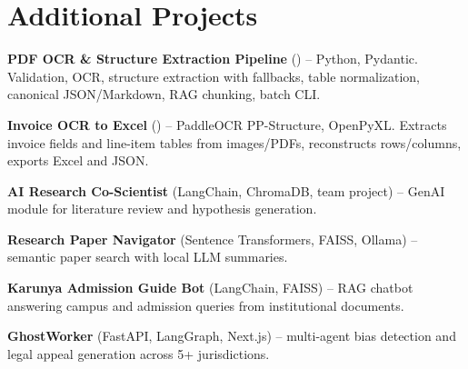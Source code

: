 \documentclass[a4paper,10pt]{article}
\begin{document}
\section{Additional Projects}
\begin{points}
  \item \textbf{PDF OCR \& Structure Extraction Pipeline} () -- Python, Pydantic. Validation, OCR, structure extraction with fallbacks, table normalization, canonical JSON/Markdown, RAG chunking, batch CLI.
  \item \textbf{Invoice OCR to Excel} () -- PaddleOCR PP-Structure, OpenPyXL. Extracts invoice fields and line-item tables from images/PDFs, reconstructs rows/columns, exports Excel and JSON.
  \item \textbf{AI Research Co-Scientist} (LangChain, ChromaDB, team project) -- GenAI module for literature review and hypothesis generation.
  \item \textbf{Research Paper Navigator} (Sentence Transformers, FAISS, Ollama) -- semantic paper search with local LLM summaries.
  \item \textbf{Karunya Admission Guide Bot} (LangChain, FAISS) -- RAG chatbot answering campus and admission queries from institutional documents.
  \item \textbf{GhostWorker} (FastAPI, LangGraph, Next.js) -- multi-agent bias detection and legal appeal generation across 5+ jurisdictions.
\end{points}
\end{document}
